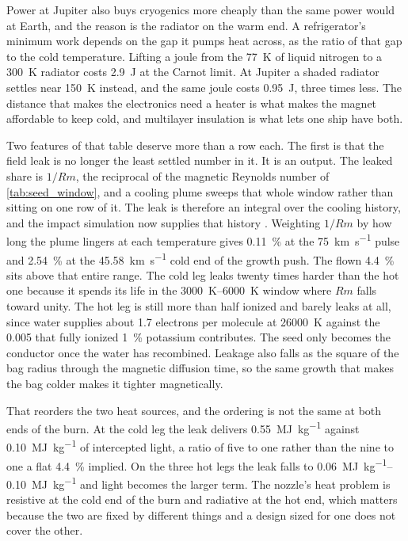 \documentclass{article}
\begin{document}
Power at Jupiter also buys cryogenics more cheaply than the same power would at Earth, and the reason is the radiator on the warm end. A refrigerator's minimum work depends on the gap it pumps heat across, as the ratio of that gap to the cold temperature. Lifting a joule from the \SI{77}{\kelvin} of liquid nitrogen to a \SI{300}{\kelvin} radiator costs \SI{2.9}{\joule} at the Carnot limit. At Jupiter a shaded radiator settles near \SI{150}{\kelvin} instead, and the same joule costs \SI{0.95}{\joule}, three times less. The distance that makes the electronics need a heater is what makes the magnet affordable to keep cold, and multilayer insulation is what lets one ship have both.

Two features of that table deserve more than a row each. The first is that the field leak is no longer the least settled number in it. It is an output. The leaked share is $1/Rm$, the reciprocal of the magnetic Reynolds number of \autoref{tab:seed_window}, and a cooling plume sweeps that whole window rather than sitting on one row of it. The leak is therefore an integral over the cooling history, and the impact simulation now supplies that history \cite{Katz_puffsat_impact_sim_2026}. Weighting $1/Rm$ by how long the plume lingers at each temperature gives \SI{0.11}{\percent} at the \SI{75}{\kilo\meter\per\second} pulse and \SI{2.54}{\percent} at the \SI{45.58}{\kilo\meter\per\second} cold end of the growth push. The flown \SI{4.4}{\percent} sits above that entire range. The cold leg leaks twenty times harder than the hot one because it spends its life in the \SIrange{3000}{6000}{\kelvin} window where $Rm$ falls toward unity. The hot leg is still more than half ionized and barely leaks at all, since water supplies about \num{1.7} electrons per molecule at \SI{26000}{\kelvin} against the \num{0.005} that fully ionized \SI{1}{\percent} potassium contributes. The seed only becomes the conductor once the water has recombined. Leakage also falls as the square of the bag radius through the magnetic diffusion time, so the same growth that makes the bag colder makes it tighter magnetically.

That reorders the two heat sources, and the ordering is not the same at both ends of the burn. At the cold leg the leak delivers \SI{0.55}{\mega\joule\per\kilogram} against \SI{0.10}{\mega\joule\per\kilogram} of intercepted light, a ratio of five to one rather than the nine to one a flat \SI{4.4}{\percent} implied. On the three hot legs the leak falls to \SIrange[range-phrase={--},range-units=single]{0.06}{0.10}{\mega\joule\per\kilogram} and light becomes the larger term. The nozzle's heat problem is resistive at the cold end of the burn and radiative at the hot end, which matters because the two are fixed by different things and a design sized for one does not cover the other.
\end{document}
